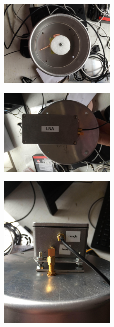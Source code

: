 \documentclass[11pt]{article} %
\begin{document}
\begin{figure}
  \centering
  \caption{   }
  \includegraphics[width=0.50\textwidth]{feed/18.jpeg}
\end{figure}


\begin{figure}
  \centering
  \caption{   }
  \includegraphics[width=0.50\textwidth]{feed/19.jpeg}
\end{figure}


\begin{figure}
  \centering
  \caption{   }
  \includegraphics[width=0.50\textwidth]{feed/20.jpeg}
\end{figure}
\end{document}
